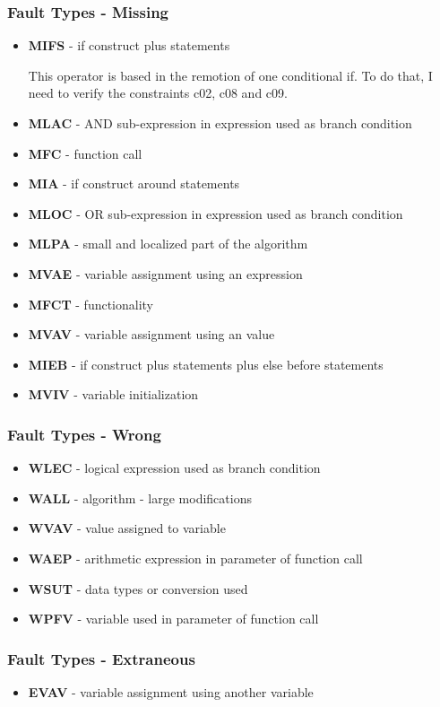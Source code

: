 \subsubsection{Fault Types - Missing}
\begin{itemize}
	\item \textbf{MIFS} - if construct plus statements

	This operator is based in the remotion of one conditional if. To do that, I need to verify the constraints c02, c08 and c09.
	\item \textbf{MLAC} - AND sub-expression in expression used as branch condition
	\item \textbf{MFC}  - function call
	\item \textbf{MIA}  - if construct around statements
	\item \textbf{MLOC} - OR sub-expression in expression used as branch condition
	\item \textbf{MLPA} - small and localized part of the algorithm
	\item \textbf{MVAE} - variable assignment using an expression
	\item \textbf{MFCT} - functionality
	\item \textbf{MVAV} - variable assignment using an value
	\item \textbf{MIEB} - if construct plus statements plus else before statements
	\item \textbf{MVIV} - variable initialization
\end{itemize}

\subsubsection{Fault Types - Wrong}
\begin{itemize}
	\item \textbf{WLEC} - logical expression used as branch condition
	\item \textbf{WALL} - algorithm - large modifications
	\item \textbf{WVAV} - value assigned to variable
	\item \textbf{WAEP} - arithmetic expression in parameter of function call
	\item \textbf{WSUT} - data types or conversion used
	\item \textbf{WPFV} - variable used in parameter of function call
\end{itemize}

\subsubsection{Fault Types - Extraneous}
\begin{itemize}
	\item \textbf{EVAV} - variable assignment using another variable
\end{itemize}

